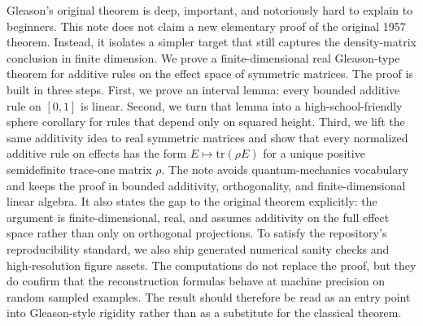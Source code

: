 Gleason's original theorem is deep, important, and notoriously hard to explain to beginners. This note does not claim a new elementary proof of the original 1957 theorem. Instead, it isolates a simpler target that still captures the density-matrix conclusion in finite dimension. We prove a finite-dimensional real Gleason-type theorem for additive rules on the effect space of symmetric matrices. The proof is built in three steps. First, we prove an interval lemma: every bounded additive rule on $[0,1]$ is linear. Second, we turn that lemma into a high-school-friendly sphere corollary for rules that depend only on squared height. Third, we lift the same additivity idea to real symmetric matrices and show that every normalized additive rule on effects has the form $E \mapsto \mathrm{tr}(\rho E)$ for a unique positive semidefinite trace-one matrix $\rho$. The note avoids quantum-mechanics vocabulary and keeps the proof in bounded additivity, orthogonality, and finite-dimensional linear algebra. It also states the gap to the original theorem explicitly: the argument is finite-dimensional, real, and assumes additivity on the full effect space rather than only on orthogonal projections. To satisfy the repository's reproducibility standard, we also ship generated numerical sanity checks and high-resolution figure assets. The computations do not replace the proof, but they do confirm that the reconstruction formulas behave at machine precision on random sampled examples. The result should therefore be read as an entry point into Gleason-style rigidity rather than as a substitute for the classical theorem.
